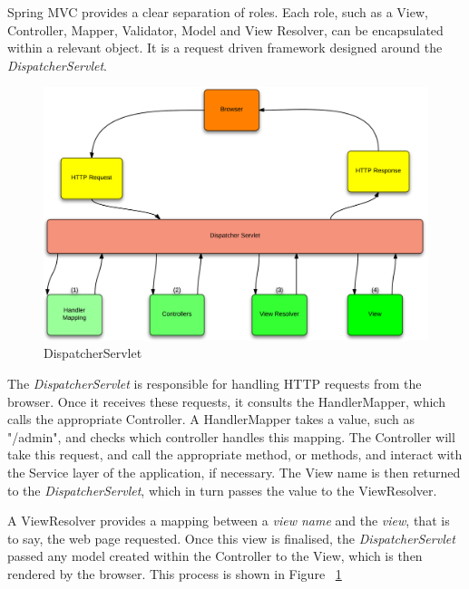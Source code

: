 Spring MVC provides a clear separation of roles. Each role, such as a View, Controller, Mapper, Validator, Model and View Resolver, can be encapsulated within a relevant object. It is a request driven framework designed around the \textit{DispatcherServlet}. 

\begin{figure}[H]
\begin{center}
\includegraphics[width=14cm]{dispatchservlet.png}
\end{center}
\caption{DispatcherServlet}
\label{fig:dispatcherflow}
\end{figure}

The \textit{DispatcherServlet} is responsible for handling HTTP requests from the browser. Once it receives these requests, it consults the HandlerMapper, which calls the appropriate Controller. A HandlerMapper takes a value, such as "/admin", and checks which controller handles this mapping. The Controller will take this request, and call the appropriate method, or methods, and interact with the Service layer of the application, if necessary. The View name is then returned to the \textit{DispatcherServlet}, which in turn passes the value to the ViewResolver. 

A ViewResolver provides a mapping between a \textit{view name} and the \textit{view}, that is to say, the web page requested. Once this view is finalised, the \textit{DispatcherServlet} passed any model created within the Controller to the View, which is then rendered by the browser. This process is shown in Figure ~\ref{fig:dispatcherflow}


